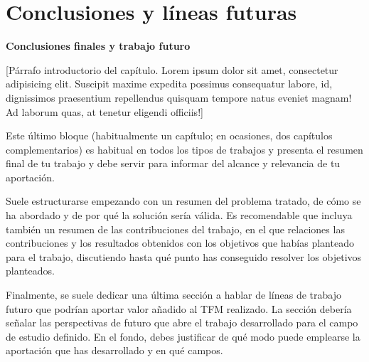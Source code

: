 \chapter{Conclusiones y líneas futuras}\label{chap:conclusiones}
\textbf{Conclusiones finales y trabajo futuro}

[Párrafo introductorio del capítulo. Lorem ipsum dolor sit amet, consectetur adipisicing elit. Suscipit maxime expedita possimus consequatur labore, id, dignissimos praesentium repellendus quisquam tempore natus eveniet magnam! Ad laborum quas, at tenetur eligendi officiis!]

Este último bloque (habitualmente un capítulo; en ocasiones, dos capítulos complementarios) es habitual en todos los tipos de trabajos y presenta el resumen final de tu trabajo y debe servir para informar del alcance y relevancia de tu aportación.\par

Suele estructurarse empezando con un resumen del problema tratado, de cómo se ha abordado y de por qué la solución sería válida.
Es recomendable que incluya también un resumen de las contribuciones del trabajo, en el que relaciones las contribuciones y los resultados obtenidos con los objetivos que habías planteado para el trabajo, discutiendo hasta qué punto has conseguido resolver los objetivos planteados.\par

Finalmente, se suele dedicar una última sección a hablar de líneas de trabajo futuro que podrían aportar valor añadido al TFM realizado. La sección debería señalar las perspectivas de futuro que abre el trabajo desarrollado para el campo de estudio definido. En el fondo, debes justificar de qué modo puede emplearse la aportación que has desarrollado y en qué campos.
